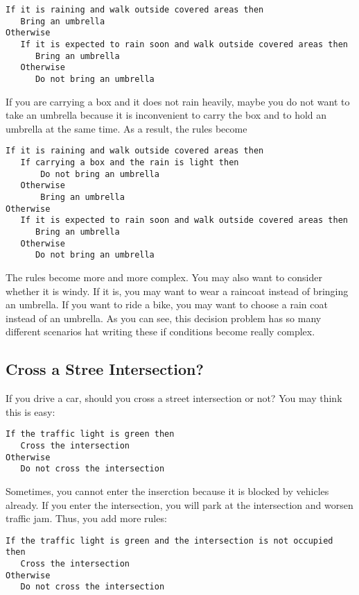 \begin{verbatim}
If it is raining and walk outside covered areas then
   Bring an umbrella
Otherwise
   If it is expected to rain soon and walk outside covered areas then
      Bring an umbrella
   Otherwise
      Do not bring an umbrella
\end{verbatim}

If you are carrying a box and it does not rain heavily, maybe you
do not want to take an umbrella because it is inconvenient to carry
the box and to hold an umbrella at the same time. As a result,
the rules become

\begin{verbatim}
If it is raining and walk outside covered areas then
   If carrying a box and the rain is light then
       Do not bring an umbrella
   Otherwise
       Bring an umbrella
Otherwise
   If it is expected to rain soon and walk outside covered areas then
      Bring an umbrella
   Otherwise
      Do not bring an umbrella
\end{verbatim}

The rules become more and more complex.  You may also want to consider
whether it is windy. If it is, you may want to wear a raincoat instead
of bringing an umbrella. If you want to ride a bike, you may want to
choose a rain coat instead of an umbrella.  As you can see, this
decision problem has so many different scenarios hat writing these if
conditions become really complex.

\subsection{Cross a Stree Intersection?}

If you drive a car, should you cross a street intersection or not?
You may think this is easy:

\begin{verbatim}
If the traffic light is green then
   Cross the intersection
Otherwise
   Do not cross the intersection
\end{verbatim}

Sometimes, you cannot enter the inserction because it is blocked
by vehicles already. If you enter the intersection, you will park
at the intersection and worsen traffic jam. Thus, you add more rules:

\begin{verbatim}
If the traffic light is green and the intersection is not occupied then
   Cross the intersection
Otherwise
   Do not cross the intersection
\end{verbatim}

